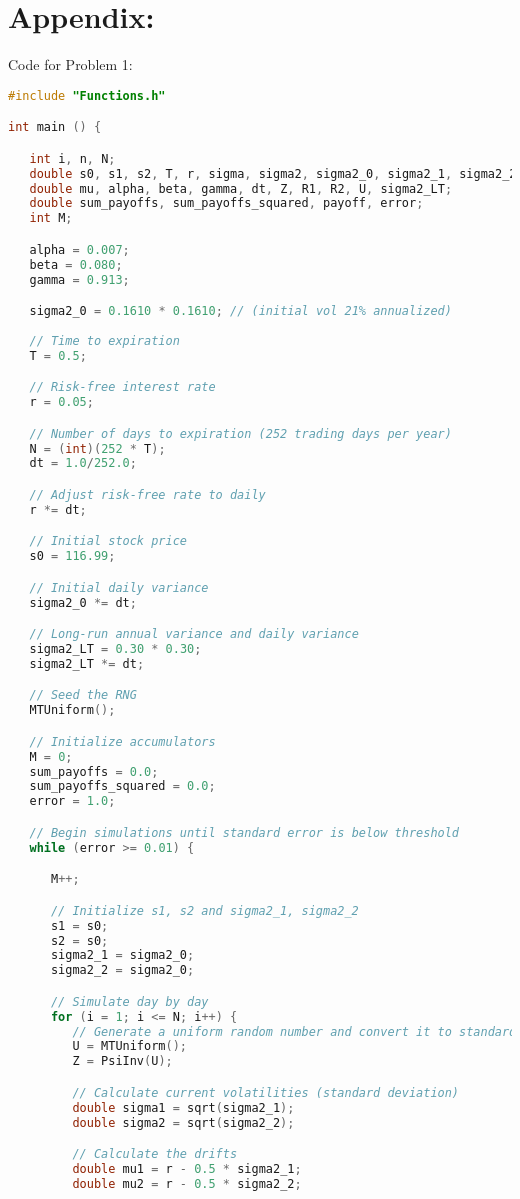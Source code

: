 \documentclass{report}
\begin{document}
\section*{Appendix:}
Code for Problem 1:
\begin{lstlisting}[language=C++]
#include "Functions.h"

int main () {

   int i, n, N;
   double s0, s1, s2, T, r, sigma, sigma2, sigma2_0, sigma2_1, sigma2_2;
   double mu, alpha, beta, gamma, dt, Z, R1, R2, U, sigma2_LT;
   double sum_payoffs, sum_payoffs_squared, payoff, error;
   int M;

   alpha = 0.007;
   beta = 0.080;
   gamma = 0.913;

   sigma2_0 = 0.1610 * 0.1610; // (initial vol 21% annualized)
   
   // Time to expiration
   T = 0.5;

   // Risk-free interest rate
   r = 0.05;

   // Number of days to expiration (252 trading days per year)
   N = (int)(252 * T);
   dt = 1.0/252.0;

   // Adjust risk-free rate to daily
   r *= dt;

   // Initial stock price
   s0 = 116.99;

   // Initial daily variance
   sigma2_0 *= dt;

   // Long-run annual variance and daily variance
   sigma2_LT = 0.30 * 0.30;
   sigma2_LT *= dt;

   // Seed the RNG
   MTUniform();

   // Initialize accumulators
   M = 0;
   sum_payoffs = 0.0;
   sum_payoffs_squared = 0.0;
   error = 1.0;

   // Begin simulations until standard error is below threshold
   while (error >= 0.01) {

      M++;

      // Initialize s1, s2 and sigma2_1, sigma2_2
      s1 = s0;
      s2 = s0;
      sigma2_1 = sigma2_0;
      sigma2_2 = sigma2_0;

      // Simulate day by day
      for (i = 1; i <= N; i++) {
         // Generate a uniform random number and convert it to standard normal
         U = MTUniform();
         Z = PsiInv(U);

         // Calculate current volatilities (standard deviation)
         double sigma1 = sqrt(sigma2_1);
         double sigma2 = sqrt(sigma2_2);

         // Calculate the drifts
         double mu1 = r - 0.5 * sigma2_1;
         double mu2 = r - 0.5 * sigma2_2;


\end{lstlisting}
\end{document}
